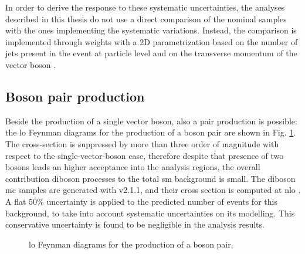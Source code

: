 In order to derive the response to these systematic uncertainties, the analyses described in this thesis do not use a direct comparison of the nominal 
samples with the ones implementing the systematic variations.
Instead, the comparison is implemented through weights with a 2D parametrization based on the number of jets present in the event at particle level 
and on the transverse momentum of the vector boson \cite{Anders:2291836}.


\subsection{Boson pair production}

Beside the production of a single vector boson, also a pair production is possible: 
the \gls{lo} Feynman diagrams for the production of a boson pair are shown in Fig. \ref{fig:dib_prod}.
The cross-section is suppressed by more than three order of magnitude with respect to the 
single-vector-boson case, therefore despite that presence of two bosons leads an higher acceptance into the analysis regions,
the overall contribution diboson processes to the total \gls{sm} background is small. 
The diboson \gls{mc} samples are generated with \Sherpa v2.1.1, and their cross section is computed at \gls{nlo} \cite{ATL-PHYS-PUB-2016-002,ATL-PHYS-PUB-2017-005}.
A flat 50\% uncertainty is applied to the predicted number of events for this background, to take into account 
systematic uncertainties on its modelling. This conservative uncertainty is found to be negligible in the analysis results. 


\begin{figure}[h]
\centering 
{}
\caption{\gls{lo} Feynman diagrams for the production of a boson pair.}\label{fig:dib_prod}
\end{figure}



